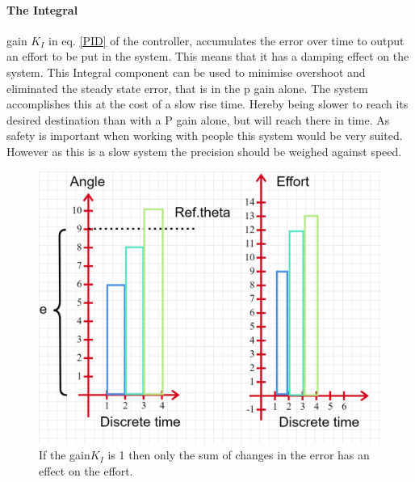 \paragraph{The Integral} gain $K_I$ in eq. \ref{PID} of the controller, accumulates the error over time to output an effort to be put in the system. This means that it has a damping effect on the system. This Integral component can be used to minimise overshoot and eliminated the steady state error, that is in the p gain alone. The system accomplishes this at the cost of a slow rise time. Hereby being slower to reach its desired destination than with a P gain alone, but will reach there in time. As safety is important when working with people this system would be very suited. However as this is a slow system the precision should be weighed against speed\cite{Control1DK}. \\

\begin{figure}[H]
    \centering
    \includegraphics[width=\textwidth]{Figures/Technical_figures/IGAIN.png} 
    \caption{If the gain$K_I$ is 1 then only the sum of changes in the error has an effect on the effort.}
    \label{fig:IGain}
\end{figure}
